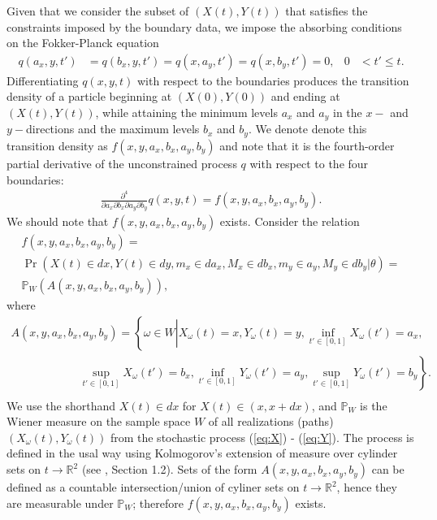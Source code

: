 Given that we consider the subset of $(X(t), Y(t))$ that satisfies the constraints imposed by the boundary data, we impose the absorbing conditions on the Fokker-Planck equation
\begin{align}
  q(a_x, y,t') &= q(b_x,y,t') = q(x,a_y,t') = q(x,b_y,t') = 0, & 0 &< t' \leq t. \label{eq:2}
\end{align}
Differentiating $q(x,y,t)$ with respect to the boundaries produces the
transition density of a particle beginning at $(X(0), Y(0))$ and
ending at $(X(t), Y(t))$, while attaining the minimum levels $a_x$ and
$a_y$ in the $x-$ and $y-$directions and the maximum levels $b_x$ and
$b_y$. We denote denote this transition density as
$f(x,y,a_x,b_x,a_y,b_y)$ and note that it is  the fourth-order partial derivative of the unconstrained process $q$ with respect to the four boundaries:
\begin{align}
  \frac{\partial^4}{\partial a_x \partial b_x \partial a_y \partial b_y} q(x,y,t) = f(x,y,a_x,b_x,a_y,b_y).
  \label{eq:pdf}
\end{align}
We should note that $f(x,y,a_x,b_x,a_y,b_y)$ exists. Consider the relation
\begin{multline*}
  f(x,y,a_x,b_x,a_y,b_y) = \\
  \Pr\left(X(t) \in dx, Y(t) \in dy, m_x \in da_x, M_x \in db_x, m_y
    \in a_y, M_y \in db_y \left| \theta \right.\right) = \\
  \mathbb{P}_{W}\left( A(x,y,a_x,b_x,a_y,b_y) \right),
  \end{multline*}
  where
  \begin{multline*}
    A(x,y,a_x,b_x,a_y,b_y) = \left\{ \omega \in W \left| X_\omega(t) = x,
     Y_\omega(t)=y, \inf_{t'\in [0,1]} X_\omega(t') = a_x, \right.  \right. \\
   \qquad \qquad \qquad \left. \sup_{t'\in [0,1]} X_\omega(t') = b_x, \inf_{t'\in [0,1]}
         Y_\omega(t') = a_y, \sup_{t'\in [0,1]} Y_\omega(t') = b_y
     \right\}. \\
   \end{multline*}
   We use the shorthand $X(t) \in dx$ for $X(t) \in (x, x+dx)$, and
   $\mathbb{P}_{W}$ is the Wiener measure on the sample space $W$ of
   all realizations (paths) $(X_\omega(t), Y_\omega(t))$ from the
   stochastic process (\ref{eq:X}) - (\ref{eq:Y}). The process is defined in the usal
   way using Kolmogorov's extension of measure over cylinder sets on
   $t \to \mathbb{R}^2$ (see \cite{freidlin1985functional}, Section
   1.2). Sets of the form $A(x,y,a_x,b_x,a_y,b_y)$ can be defined as a
   countable intersection/union of cyliner sets on
   $t \to \mathbb{R}^2$, hence they are measurable under
   $\mathbb{P}_{W}$; therefore $f(x,y,a_x,b_x,a_y,b_y)$ exists.

